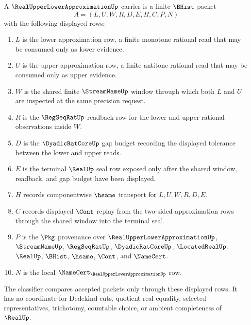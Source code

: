 \begin{definition}
\label{def:real-upper-lower-approximation-carrier}
A $\RealUpperLowerApproximationUp$ carrier is a finite $\BHist$ packet
$$
A=(L,U,W,R,D,E,H,C,P,N)
$$
with the following displayed rows:
\begin{enumerate}
\item $L$ is the lower approximation row, a finite monotone rational read that may be consumed only as lower evidence.
\item $U$ is the upper approximation row, a finite antitone rational read that may be consumed only as upper evidence.
\item $W$ is the shared finite $\StreamNameUp$ window through which both $L$ and $U$ are inspected at the same precision request.
\item $R$ is the $\RegSeqRatUp$ readback row for the lower and upper rational observations inside $W$.
\item $D$ is the $\DyadicRatCoreUp$ gap budget recording the displayed tolerance between the lower and upper reads.
\item $E$ is the terminal $\RealUp$ seal row exposed only after the shared window, readback, and gap budget have been displayed.
\item $H$ records componentwise $\hsame$ transport for $L,U,W,R,D,E$.
\item $C$ records displayed $\Cont$ replay from the two-sided approximation rows through the shared window into the terminal seal.
\item $P$ is the $\Pkg$ provenance over $\RealUpperLowerApproximationUp$, $\StreamNameUp$, $\RegSeqRatUp$, $\DyadicRatCoreUp$, $\LocatedRealUp$, $\RealUp$, $\BHist$, $\hsame$, $\Cont$, and $\NameCert$.
\item $N$ is the local $\NameCert_{\RealUpperLowerApproximationUp}$ row.
\end{enumerate}
The classifier compares accepted packets only through these displayed rows. It has no coordinate for Dedekind cuts, quotient real equality, selected representatives, trichotomy, countable choice, or ambient completeness of $\RealUp$.
\end{definition}

